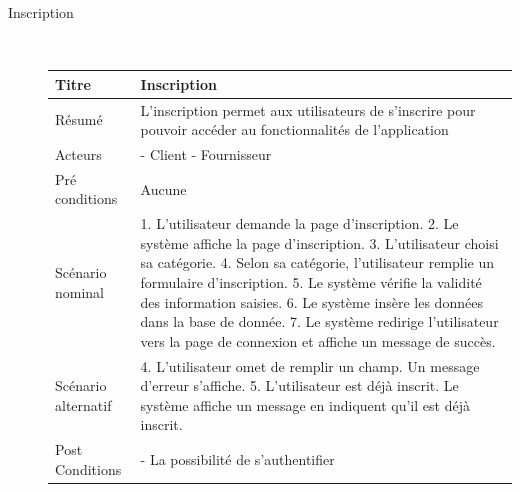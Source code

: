 \documentclass[french]{report}
\begin{document}
\newpage
    \begin{description} 
        \item[Inscription] \hfill \\
        \begin{minipage}{\linewidth}
        \centering
            \def\arraystretch{2}
            \begin{tabular}{|m{3cm}|m{9cm}|}
                \hline
                Titre                & Inscription  \\ 
                \hline
                Résumé               & L'inscription permet aux utilisateurs de s'inscrire pour pouvoir accéder 
		au fonctionnalités de l'application \\ 
                \hline
                Acteurs              & - Client \newline  - Fournisseur \\ 
                \hline
                Pré conditions       & Aucune   \\ 
                \hline
                Scénario nominal     &  
                    1. L'utilisateur demande la page d'inscription.
                    2. Le système affiche la page d'inscription.
                    3. L'utilisateur choisi sa catégorie. 
                    4. Selon sa catégorie, l'utilisateur remplie un formulaire d'inscription. 
                    5. Le système vérifie la validité des information saisies. 
                    6. Le système insère les données dans la base de donnée. 
                    7. Le système redirige l'utilisateur vers la page de connexion et affiche un message de succès.
                        
                   \\ 
                \hline
                Scénario alternatif &   
                    4. L'utilisateur omet de remplir un champ. Un message d'erreur s'affiche. 
                    5. L'utilisateur est déjà inscrit. Le système affiche un message en indiquent qu'il est déjà inscrit.
                \\ 
                \hline
                Post Conditions & 
                - La possibilité de s'authentifier 
                
            \\
            \hline
            \end{tabular}
        \end{minipage}
        

\end{description}
\end{document}
